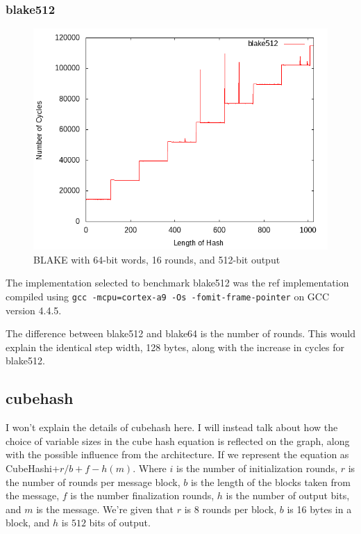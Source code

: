 \documentclass[10pt,a4paper]{article}
\begin{document}
\subsubsection{blake512}
    \begin{figure}[H]
        \begin{center}
            \includegraphics[scale=0.5]{images_fast_run/blake512.png} 
            \caption{BLAKE with 64-bit words, 16 rounds, and 512-bit output}
        \end{center}
    \end{figure}

The implementation selected to benchmark blake512 was the ref implementation
compiled using \texttt{gcc -mcpu=cortex-a9 -Os -fomit-frame-pointer} on GCC
version 4.4.5.

The difference between blake512 and blake64 is the number of rounds. This would explain the identical step width, 128 bytes, along with the increase
in cycles for blake512. 

\subsection{cubehash}

I won't explain the details of cubehash here. I will instead talk about how the
choice of variable sizes in the cube hash equation is reflected on the graph,
along with the possible influence from the architecture. If we represent the
equation as CubeHashi+$r/b+f-h(m)$. Where $i$ is the number of initialization
rounds, $r$ is the number of rounds per message block, $b$ is the length of the
blocks taken from the message, $f$ is the number finalization rounds, $h$ is the
number of output bits, and $m$ is the message. We're given that $r$ is $8$ rounds per
block, $b$ is 16 bytes in a block, and $h$ is $512$ bits of output.
\end{document}
